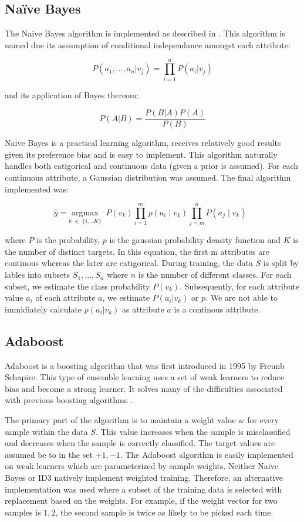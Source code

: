 \documentclass[11pt]{article}
\begin{document}
\subsection{Naïve Bayes}
The Naive Bayes algorithm is implemented as described in \cite{Mitchell:1997:ML:541177}. This algorithm is named due its assumption of conditional independance amongst each attribute:

$$P(a_1,...,a_n|v_j) = \prod_{i=1}^{n}P(a_i|v_j)$$

and its application of Bayes thereom:

$$P(A|B) = \frac{P(B|A)P(A)}{P(B)}$$

Naive Bayes is a practical learning algorithm, receives relatively good results given its preference bias and is easy to implement. This algorithm naturally handles both catigorical and continuous data (given a prior is assumed). For each continuous attribute, a Gaussian distribution was assumed. The final algorithm implemented was:

$$\hat{y}= \underset{k\;\in\;\{1,..K\}} {\mathrm{argmax}} \;\;P(v_k)\prod_{i=1}^mp\left(a_i\;|\;v_k\right)\prod_{j=m}^nP\left(a_j\;|\;v_k\right)\;\;$$

where $P$ is the probability, $p$ is the gaussian probability density function and $K$ is the number of distinct targets. In this equation, the first m attributes are continous whereas the later are catigorical. During training, the data $S$ is split by lables into subsets ${S_1,...,S_n}$ where $n$ is the number of different classes. For each subset, we estimate the class probability $P(v_k)$. Subsequently, for each attribute value $a_i$ of each attribute $a$, we estimate $P(a_i|v_k)$ or $p$. We are not able to immidiately calculate $p(a_i|v_k)$ as attribute $a$ is a continous attribute.

\subsection{Adaboost} \label{adaboost}
Adaboost is a boosting algorithm that was first introduced in 1995 by Freunb Schapire. This type of ensemble learning uses a set of weak learners to reduce bias and become a strong learner. It solves many of the difficulties associated with previous boosting algorithms \cite{Schapire:1999:BIB:1624312.1624417}.

The primary part of the algorithm is to maintain a weight value $w$ for every sample within the data $S$. This value increases when the sample is misclassified and decreases when the sample is correctly classified. The target values are assumed be to in the set ${+1, -1}$. The Adaboost algorithm is easily implemented on weak learners which are parameterized by sample weights. Neither Naive Bayes or ID3 natively implement weighted training. Therefore, an alternative implementation was used where a subset of the training data is selected with replacement based on the weights. For example, if the weight vector for two samples is ${1, 2}$, the second sample is twice as likely to be picked each time.
\end{document}
